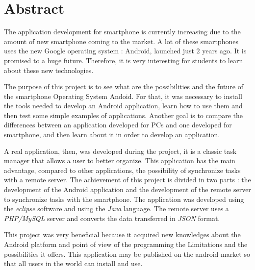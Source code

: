 \chapter*{Abstract}

\vspace{2cm}

\noindent The application development for smartphone is currently increasing due to the amount of new smartphone coming to the market. A lot of these smartphones uses the new Google operating system : Android, launched just 2 years ago. It is promised to a huge future. Therefore, it is very interesting for students to learn about these new technologies.

\noindent The purpose of this project is to see what are the possibilities and the future of the smartphone Operating System Andoid. For that, it was necessary to install the tools needed to develop an Android application, learn how to use them and then test some simple examples of applications. Another goal is to compare the differences between an application developed for PCs and one developed for smartphone, and then learn about it in order to develop an application.

\noindent A real application, then, was developed during the project, it is a classic task manager that allows a user to better organize. This application has the main advantage, compared to other applications, the possibility of synchronize tasks with a remote server. The achievement of this project is divided in two parts : the development of the Android application and the development of the remote server to synchronize tasks with the smartphone. The application was developed using the \textit{eclipse} software and using the \textit{Java} language. The remote server uses a \textit{PHP/MySQL} server and converts the data transferred in \textit{JSON} format.

\noindent This project was very beneficial because it acquired new knowledges about the Android platform and point of view of the programming the Limitations and the possibilities it offers. This application may be published on the android market so that all users in the world can install and use.

\clearpage
\newpage